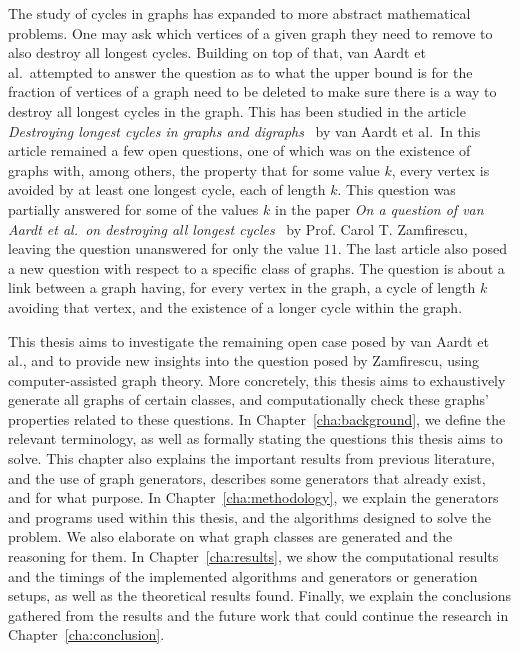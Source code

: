 The study of cycles in graphs has expanded to more abstract mathematical problems. One may ask which vertices of a given graph they need to remove to also destroy all longest cycles. Building on top of that, van Aardt et al.\ attempted to answer the question as to what the upper bound is for the fraction of vertices of a graph need to be deleted to make sure there is a way to destroy all longest cycles in the graph. This has been studied in the article \textit{Destroying longest cycles in graphs and digraphs}~\cite{article:van-aardt} by van Aardt et al.\ In this article remained a few open questions, one of which was on the existence of graphs with, among others, the property that for some value $k$, every vertex is avoided by at least one longest cycle, each of length $k$. This question was partially answered for some of the values $k$ in the paper \textit{On a question of van Aardt et al.\ on destroying all longest cycles}~\cite{article:zamfirescu} by Prof. Carol T. Zamfirescu, leaving the question unanswered for only the value $11$. The last article also posed a new question with respect to a specific class of graphs. The question is about a link between a graph having, for every vertex in the graph, a cycle of length $k$ avoiding that vertex, and the existence of a longer cycle within the graph. 

This thesis aims to investigate the remaining open case posed by van Aardt et al., and to provide new insights into the question posed by Zamfirescu, using computer-assisted graph theory. More concretely, this thesis aims to exhaustively generate all graphs of certain classes, and computationally check these graphs' properties related to these questions. In Chapter~\ref{cha:background}, we define the relevant terminology, as well as formally stating the questions this thesis aims to solve. This chapter also explains the important results from previous literature, and the use of graph generators, describes some generators that already exist, and for what purpose. In Chapter~\ref{cha:methodology}, we explain the generators and programs used within this thesis, and the algorithms designed to solve the problem. We also elaborate on what graph classes are generated and the reasoning for them. In Chapter~\ref{cha:results}, we show the computational results and the timings of the implemented algorithms and generators or generation setups, as well as the theoretical results found. Finally, we explain the conclusions gathered from the results and the future work that could continue the research in Chapter~\ref{cha:conclusion}.
